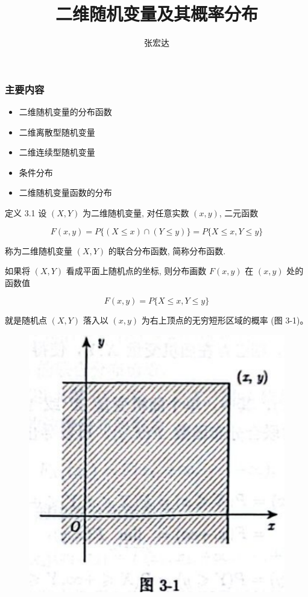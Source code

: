 \documentclass{beamer}
\title[]{二维随机变量及其概率分布}
\author[概率统计]{张宏达}
\institute{Nanjing University}
\date{}
\begin{document}
	\begin{frame}
		\titlepage
	\end{frame}
	
	\begin{frame}
		\frametitle{主要内容}
		\begin{itemize}
			\item 二维随机变量的分布函数
			\item 二维离散型随机变量
			\item 二维连续型随机变量
			\item 条件分布
			\item 二维随机变量函数的分布
		\end{itemize}
	\end{frame}
	
	\begin{frame}
		定义 3.1 设 $(X, Y)$ 为二维随机变量, 对任意实数 $(x, y)$, 二元函数
		
		$$
		F(x, y)=P\{(X \leqslant x) \cap(Y \leqslant y)\}=P\{X \leqslant x, Y \leqslant y\}
		$$
		
		称为二维随机变量 $(X, Y)$ 的联合分布函数, 简称分布函数.
	\end{frame}
	
	\begin{frame}
		如果将 $(X, Y)$ 看成平面上随机点的坐标, 则分布画数 $F(x, y)$ 在 $(x, y)$ 处的函数值
		
		$$
		F(x, y)=P\{X \leqslant x, Y \leqslant y\}
		$$
		
		就是随机点 $(X, Y)$ 落入以 $(x, y)$ 为右上顶点的无穷短形区域的概率 (图 3-1)。
		\begin{figure}
			\centering
			\includegraphics[scale = 0.3]{figures/figure3-1.png}
		\end{figure}
	\end{frame}
	
\end{document}
